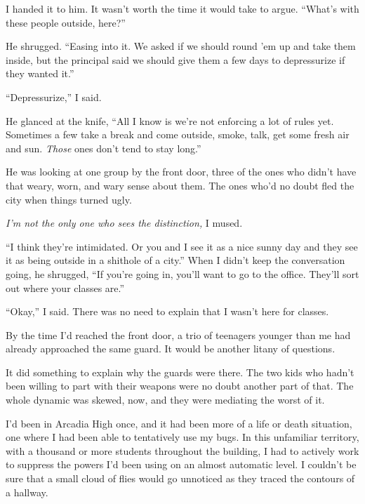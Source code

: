I handed it to him.  It wasn't worth the time it would take to argue.  ``What's with these people outside, here?''



He shrugged.  ``Easing into it.  We asked if we should round 'em up and take them inside, but the principal said we should give them a few days to depressurize if they wanted it.''



``Depressurize,'' I said.



He glanced at the knife, ``All I know is we're not enforcing a lot of rules yet.  Sometimes a few take a break and come outside, smoke, talk, get some fresh air and sun.  \emph{Those }ones don't tend to stay long.''



He was looking at one group by the front door, three of the ones who didn't have that weary, worn, and wary sense about them.  The ones who'd no doubt fled the city when things turned ugly.



\emph{I'm not the only one who sees the distinction, }I mused.



``I think they're intimidated.  Or you and I see it as a nice sunny day and they see it as being outside in a shithole of a city.''  When I didn't keep the conversation going, he shrugged, ``If you're going in, you'll want to go to the office.  They'll sort out where your classes are.''



``Okay,'' I said.  There was no need to explain that I wasn't here for classes.



By the time I'd reached the front door, a trio of teenagers younger than me had already approached the same guard.  It would be another litany of questions.



It did something to explain why the guards were there.  The two kids who hadn't been willing to part with their weapons were no doubt another part of that.  The whole dynamic was skewed, now, and they were mediating the worst of it.



I'd been in Arcadia High once, and it had been more of a life or death situation, one where I had been able to tentatively use my bugs.  In this unfamiliar territory, with a thousand or more students throughout the building, I had to actively work to suppress the powers I'd been using on an almost automatic level.  I couldn't be sure that a small cloud of flies would go unnoticed as they traced the contours of a hallway.



